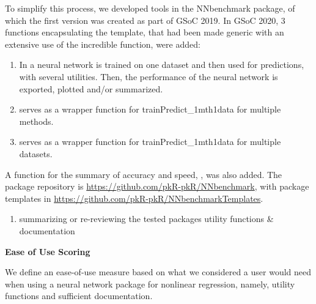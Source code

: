 To simplify this process, we developed tools in the NNbenchmark package,
of which the first version was created as part of GSoC 2019. In GSoC
2020, 3 functions encapsulating the template, that had been made generic
with an extensive use of the incredible  function, were
added:

\begin{enumerate}
\def\labelenumi{\arabic{enumi}.}
\tightlist
\item
  In  a neural network is trained on one
  dataset and then used for predictions, with several utilities. Then,
  the performance of the neural network is exported, plotted and/or
  summarized.
\item
   serves as a wrapper function for
  trainPredict\_1mth1data for multiple methods.
\item
   serves as a wrapper function for
  trainPredict\_1mth1data for multiple datasets.
\end{enumerate}

A function for the summary of accuracy and speed, , was
also added. The package repository is
\url{https://github.com/pkR-pkR/NNbenchmark}, with package templates in
\url{https://github.com/pkR-pkR/NNbenchmarkTemplates}.

\begin{enumerate}
\def\labelenumi{\arabic{enumi}.}
\setcounter{enumi}{2}
\tightlist
\item
  summarizing or re-reviewing the tested packages utility functions \&
  documentation
\end{enumerate}

\textbf{Ease of Use Scoring}

We define an ease-of-use measure based on what we considered a user
would need when using a neural network package for nonlinear regression,
namely, utility functions and sufficient documentation.

